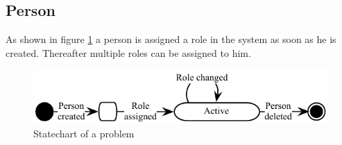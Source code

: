 \subsection{Person}
As shown in figure \ref{fig:Klasse_diagram_person} a person is assigned a role in the system as soon as he is created. Thereafter multiple roles can be assigned to him.
\begin{figure}[H]
\begin{center}
\includegraphics[scale=1]{input/problem_domain_analysis/Klassediagram_person.pdf}
\caption{Statechart of a problem}
\label{fig:Klasse_diagram_person}
\end{center}
\end{figure}

